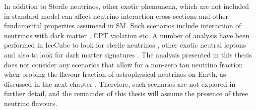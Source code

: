 In addition to Sterile neutrinos, other exotic phenomena, which are not included in standard model can affect neutrino interaction cross-sections and other fundamental properties assumeed in SM. Such scenarios include interaction of neutrinos with dark matter , CPT violation  etc. A number of analysis have been performed in IceCube to look for sterile neutrinos , other exotic neutral leptons  and also to look for dark matter signatures . The analysis presented in this thesis does not consider any scenarios that allow for a non-zero tau neutrino fraction when probing the flavour fraction of astrophysical neutrinos on Earth, as discussed in the next chapter . Therefore, such scenarios are not explored in further detail, and the remainder of this thesis will assume the presence of three neutrino flavours.